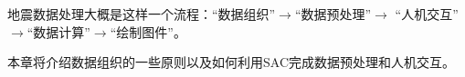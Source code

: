 地震数据处理大概是这样一个流程：``数据组织''$\rightarrow$``数据预处理''$\rightarrow$
``人机交互''$\rightarrow$``数据计算''$\rightarrow$``绘制图件''。

本章将介绍数据组织的一些原则以及如何利用SAC完成数据预处理和人机交互。
